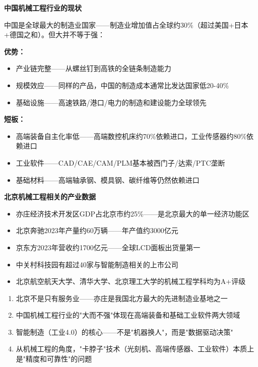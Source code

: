 \documentclass[a4paper,11pt]{ctexbook}
\newenvironment{qualitative}{
  \vspace{0.3cm}
  \noindent\begin{tcolorbox}[colback=themeblue!5!white,colframe=themeblue!60!black,title=\textcolor{themeblue}{\textbf{定性分析}}]
  \vspace{0.1cm}
}{\end{tcolorbox}\vspace{0.3cm}}
\newenvironment{quantitative}{
  \vspace{0.3cm}
  \noindent\begin{tcolorbox}[colback=quant!5!white,colframe=quant!60!black,title=\textcolor{quant}{\textbf{定量分析}}]
  \vspace{0.1cm}
}{\end{tcolorbox}\vspace{0.3cm}}
\newenvironment{lessonsummary}{
  \vspace{0.3cm}
  \noindent\begin{tcolorbox}[colback=summarybg,colframe=green!50!black,title=\textbf{\textcolor{green!50!black}{总结}}]
  \vspace{0.1cm}
}{\end{tcolorbox}\vspace{0.3cm}}
\begin{document}
\begin{qualitative}
\textbf{中国机械工程行业的现状}

中国是全球最大的制造业国家——制造业增加值占全球约30\%（超过美国+日本+德国之和）。但大并不等于强：

\textbf{优势：}
\begin{itemize}
  \item 产业链完整——从螺丝钉到高铁的全链条制造能力
  \item 规模效应——同样的产品，中国的制造成本通常比发达国家低20-40\%
  \item 基础设施——高速铁路/港口/电力的制造和建设能力全球领先
\end{itemize}

\textbf{短板：}
\begin{itemize}
  \item 高端装备自主化率低——高端数控机床约70\%依赖进口，工业传感器约80\%依赖进口
  \item 工业软件——CAD/CAE/CAM/PLM基本被西门子/达索/PTC垄断
  \item 基础材料——高端轴承钢、模具钢、碳纤维等仍然依赖进口
\end{itemize}
\end{qualitative}

\begin{quantitative}
\textbf{北京机械工程相关的产业数据}

\begin{itemize}
  \item 亦庄经济技术开发区GDP占北京市约25\%——是北京最大的单一经济功能区
  \item 北京奔驰2023年产量约60万辆——年产值约3000亿元
  \item 京东方2023年营收约1700亿元——全球LCD面板出货量第一
  \item 中关村科技园有超过40家与智能制造相关的上市公司
  \item 北京航空航天大学、清华大学、北京理工大学的机械工程学科均为A+评级
\end{itemize}
\end{quantitative}

\begin{lessonsummary}
\begin{enumerate}
  \item 北京不是只有服务业——亦庄是我国北方最大的先进制造业基地之一
  \item 中国机械工程行业的"大而不强"体现在高端装备和基础工业软件两大领域
  \item 智能制造（工业4.0）的核心——不是"机器换人"，而是"数据驱动决策"
  \item 从机械工程的角度，"卡脖子"技术（光刻机、高端传感器、工业软件）本质上是"精度和可靠性"的问题
\end{enumerate}
\end{lessonsummary}
\end{document}
